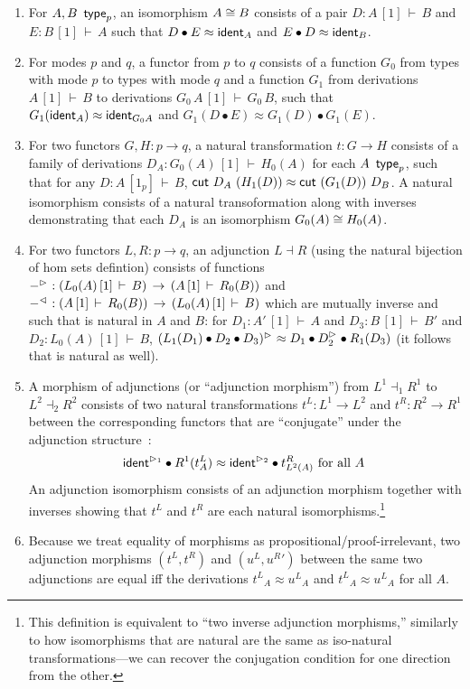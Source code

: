 \documentclass{drl-common/llncs}
\newcommand{\la}{\ensuremath{\dashv}}
\renewcommand\wftp[2]{\ensuremath{#1 \,\,\, \dsd{type}_{#2}}}
\newcommand\seq[3]{\ensuremath{#1 \, [ #2 ] \, \vdash \, #3}}
\newcommand\ident[1]{\ensuremath{\dsd{ident}_{#1}}}
\newcommand\cut[2]{\ensuremath{{\dsd{cut} \,\, #1 \,\, #2}}}
\newcommand\cuti{\ensuremath{\bullet}}
\newcommand\ap[2]{\ensuremath{#1 \approx #2}}
\begin{document}
\begin{enumerate}
\item For $\wftp{A,B}{p}$, an isomorphism $A \cong B$ consists of a pair $D :
\seq{A}{1}{B}$ and $E : \seq{B}{1}{A}$ such that
$\ap{{D} \cuti {E}}{\ident{A}}$ and $\ap{{E} \cuti {D}}{\ident{B}}$.

\item For modes $p$ and $q$, a functor from $p$ to $q$ consists of 
a function $G_0$ from types with mode $p$ to types with mode $q$ 
and a function $G_1$ from derivations \seq{A}{1}{B} to 
derivations \seq{G_0 \, A}{1}{G_0 \, B}, such that
$\ap {G_1(\ident{A})}  {\ident{G_0 A}}$
and
$\ap {G_1(D \cuti E)}  {G_1(D) \cuti G_1(E)}$.

\item For two functors $G,H : p \to q$, a natural transformation $t : G
  \to H$ consists of a family of derivations $D_A :
  \seq{G_0(A)}{1}{H_0(A)}$ for each \wftp{A}{p}, such that for any $D :
  \seq{A}{1_p}{B}$, \ap{\cut{D_A}{(H_1(D))}}{\cut{(G_1(D))}{D_B}}.  A
  natural isomorphism consists of a natural transoformation along with
  inverses demonstrating that each $D_A$ is an isomorphism $G_0(A) \cong
  H_0(A)$.  

\item For two functors $L,R : p \to q$, an adjunction $L \la R$ (using
  the natural bijection of hom sets defintion) consists of functions
  $\ltor{-}{} : (\seq{L_0(A)}{1}{B}) \, \to \, (\seq{A}{1}{R_0(B)})$ and
  $\rtol{-}{} : (\seq{A}{1}{R_0(B)}) \, \to \, (\seq{L_0(A)}{1}{B})$ which are
  mutually inverse and such that \ltor{-}{} is natural in $A$ and $B$: for
  $D_1 : \seq{A'}{1}{A}$ and $D_3 : \seq{B}{1}{B'}$ and $D_2 :
  \seq{L_0(A)}{1}{B}$, \ap{\ltor{(L_1(D_1) \cuti D_2 \cuti D_3)}{}}{D_1
    \cuti \ltor{D_2}{} \cuti {R_1(D_3)}} (it follows that \rtol{-}{} is
  natural as well).  

\item A morphism of adjunctions (or ``adjunction morphism'') from $L^1
  \la_1 R^1$ to $L^2 \la_2 R^2$ consists of two natural transformations
  $t^L : L^1 \to L^2$ and $t^R : R^2 \to R^1$ between the corresponding
  functors that are ``conjugate'' under the adjunction
  structure~\citep{maclane}:
  \[
  \ap {\ltor{\ident{}}{1} \cuti {R^1(t^L_{A})}} { \ltor{\ident{}}{2} \cuti t^R_{L^2(A)} } \text{ for all $A$ }
  \]
  An adjunction isomorphism consists of an adjunction morphism together
  with inverses showing that $t^L$ and $t^R$ are each natural
  isomorphisms.\footnote{This definition is equivalent to ``two inverse
    adjunction morphisms,'' similarly to how isomorphisms that are
    natural are the same as iso-natural transformations---we can recover
    the conjugation condition for one direction from the other.}

\item Because we treat equality of morphisms as
  propositional/proof-irrelevant, two adjunction morphisms $(t^L,t^R)$
  and $({u^L},{u^R}')$ between the same two adjunctions are equal iff
  the derivations $\ap{{t^L}_A}{{u^L}_A}$ and $\ap{{t^L}_A}{{u^L}_A}$
  for all $A$.
\end{enumerate}
\end{document}
